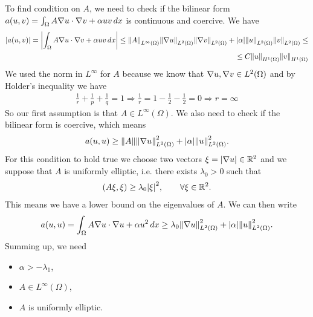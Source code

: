 To find condition on \(A\), we need to check if the bilinear form \(a(u, v) =
\int_\Omega A \nabla u \cdot \nabla v + \alpha u v \, dx\) is continuous and
coercive. We have
\[
    \begin{split}
        |a(u, v)| = \left|\int_\Omega A \nabla u \cdot \nabla v + \alpha u v \, dx\right| \leq \norm{A}_{L^\infty(\Omega)} \norm{\nabla u}_{L^2(\Omega)} \norm{\nabla v}_{L^2(\Omega)} + \abs{\alpha} \norm{u}_{L^2(\Omega)} \norm{v}_{L^2(\Omega)} \leq \\
        \leq C \norm{u}_{H^1(\Omega)} \norm{v}_{H^1(\Omega)}
    \end{split}
\]
We used the norm in \(L^\infty\) for \(A\) because we know that \(\nabla u,
\nabla v \in L^2(\Omega)\) and by Holder's inequality we have
\[
    \begin{split}
        \frac{1}{r} + \frac{1}{p} + \frac{1}{q} = 1 \Rightarrow \frac{1}{r} = 1 - \frac{1}{2} - \frac{1}{2} = 0 \Rightarrow r = \infty
    \end{split}
\]
So our first assumption is that \(A \in L^\infty(\Omega)\). We also need to
check if the bilinear form is coercive, which means
\[
    \begin{split}
        a(u, u) \geq \norm{A} \norm{\nabla u}_{L^2(\Omega)}^2 + \abs{\alpha} \norm{u}_{L^2(\Omega)}^2.
    \end{split}
\]
For this condition to hold true we choose two vectors \(\xi = \abs{\nabla u} \in
\mathbb{R}^2\) and we suppose that \(A\) is uniformly elliptic, i.e. there exists
\(\lambda_0 > 0\) such that
\[
    \begin{split}
        (A\xi, \xi) \geq \lambda_0 \abs{\xi}^2, \qquad \forall \xi \in \mathbb{R}^2.
    \end{split}
\]
This means we have a lower bound on the eigenvalues of \(A\). We can then write
\[
    \begin{split}
        a(u, u) = \int_\Omega A \nabla u \cdot \nabla u + \alpha u^2 \, dx \geq \lambda_0 \norm{\nabla u}_{L^2(\Omega)}^2 + \abs{\alpha} \norm{u}_{L^2(\Omega)}^2.
    \end{split}
\]
Summing up, we need
\begin{itemize}
    \item \(\alpha > -\lambda_1\),
    \item \(A \in L^\infty(\Omega)\),
    \item \(A\) is uniformly elliptic.
\end{itemize}

